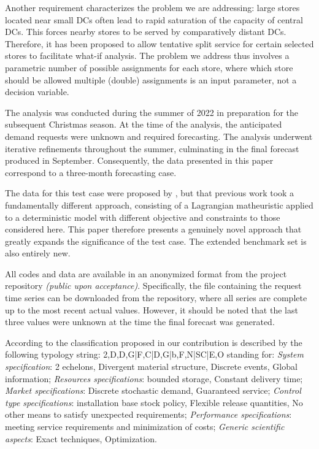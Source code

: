\documentclass[opre,sglanonrev,11pt]{informs4}
\begin{document}
Another requirement characterizes the problem we are addressing: large stores located near small DCs often lead to rapid saturation of the capacity of central DCs. This forces nearby stores to be served by comparatively distant DCs. Therefore, it has been proposed to allow tentative split service for certain selected stores to facilitate what-if analysis. The problem we address thus involves a parametric number of possible assignments for each store, where which store should be allowed multiple (double) assignments is an input parameter, not a decision variable.  

The analysis was conducted during the summer of 2022 in preparation for the subsequent Christmas season. At the time of the analysis, the anticipated demand requests were unknown and required forecasting. The analysis underwent iterative refinements throughout the summer, culminating in the final forecast produced in September. Consequently, the data presented in this paper correspond to a three-month forecasting case. 

The data for this test case were proposed by \citep{MZ23}, but that previous work took a fundamentally different approach, consisting of a Lagrangian matheuristic applied to a deterministic model with different objective and constraints to those considered here. This paper therefore presents a genuinely novel approach that greatly expands the significance of the test case. The extended benchmark set is also entirely new.

All codes and data are available in an anonymized format from the project repository 
{\it (public upon acceptance)}. Specifically, the file containing the request time series can be downloaded from the repository, where all series are complete up to the most recent actual values. However, it should be noted that the last three values were unknown at the time the final forecast was generated. 

According to the classification proposed in \cite{DEKOK2018} our contribution is described by the following typology string: 2,D,D,G|F,C|D,G|b,F,N|SC|E,O
standing for: {\it System specification}: 2 echelons, Divergent material structure, Discrete events, Global information; {\it Resources specifications}: bounded storage, Constant delivery time; {\it Market specifications}: Discrete stochastic demand, Guaranteed service; {\it Control type specifications}: installation base stock policy, Flexible release quantities, No other means to satisfy unexpected requirements; {\it Performance specifications}: meeting service requirements and minimization of costs; {\it Generic scientific aspects}: Exact techniques, Optimization.
\end{document}
